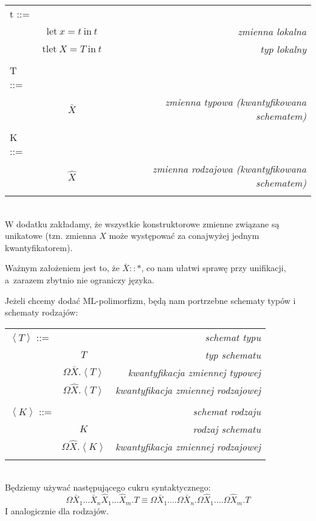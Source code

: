 \documentclass[11pt,leqno]{article}
\begin{document}
\begin{tabular}{| l c r |}
  \hline
  t ::= &  &  \\
   & $\textrm{let} \ x = t \ \textrm{in} \ t$ & \textit{zmienna lokalna} \\
   & $\textrm{tlet} \ X = T \ \textrm{in} \ t$ & \textit{typ lokalny} \\
   & & \\
  T ::= &  &  \\
   & $\bar{X}$ & \textit{zmienna typowa (kwantyfikowana schematem)} \\
   & & \\
  K ::= & & \\
   & $\widehat{X}$ & \textit{zmienna rodzajowa (kwantyfikowana schematem)} \\
   & & \\
  \hline
\end{tabular} \\

W dodatku zakładamy, że wszystkie konstruktorowe zmienne związane są unikatowe (tzn. zmienna $X$ może
występować za conajwyżej jednym kwantyfikatorem).

Ważnym założeniem jest to, że $\bar{X}::*$, co nam ułatwi sprawę przy unifikacji, a~zarazem zbytnio nie ograniczy języka.
  
Jeżeli chcemy dodać ML-polimorfizm, będą nam portrzebne schematy typów i schematy rodzajów:\\

\begin{tabular}{| l c r |}
  \hline
  $\left<T\right>$ ::= &  & \textit{schemat typu} \\
   & $T$ & \textit{typ schematu} \\
   & $\Omega \bar{X}.\left<T\right>$ & \textit{kwantyfikacja zmiennej typowej} \\
   & $\Omega \widehat{X}.\left<T\right>$ & \textit{kwantyfikacja zmiennej rodzajowej} \\
   & & \\
  $\left<K\right>$ ::= &  & \textit{schemat rodzaju} \\
   & $K$ & \textit{rodzaj schematu}\\
   & $\Omega \widehat{X}.\left<K\right>$ & \textit{kwantyfikacja zmiennej rodzajowej} \\
   & & \\
  \hline
\end{tabular} \\

Będziemy używać następującego cukru syntaktycznego:
\[
\Omega \bar{X}_1 \dots \bar{X}_n \widehat{X}_1 \dots \widehat{X}_m.T \equiv 
\Omega \bar{X}_1. \dots \Omega \bar{X}_n. \Omega \widehat{X}_1. \dots \Omega \widehat{X}_m.T
\]
I analogicznie dla rodzajów.
\end{document}

